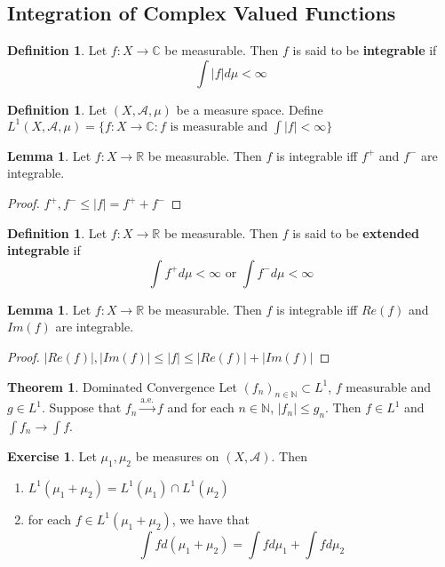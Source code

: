 \documentclass[12pt]{amsart}
\theoremstyle{definition}
\newtheorem{defn}[definition]{Definition}
\newtheorem{thm}[definition]{Theorem}
\newtheorem{lem}[definition]{Lemma}
\newtheorem{ex}[definition]{Exercise}
\newcommand{\C}{\mathbb{C}}
\newcommand{\N}{\mathbb{N}}
\newcommand{\R}{\mathbb{R}}
\newcommand{\MA}{\mathcal{A}}
\begin{document}
	\subsection{Integration of Complex Valued Functions}
	
	\begin{defn}
		Let $f:X \rightarrow \C$ be measurable. Then $f$ is said to be \textbf{integrable} if $$\int |f| d\mu < \infty$$
	\end{defn}
	
	\begin{defn}
		Let $(X, \MA, \mu)$ be a measure space. Define $L^1(X, \MA, \mu) = \{f:X \rightarrow \C : f \text{ is measurable and } \int |f| < \infty \}$
	\end{defn}
	
	\begin{lem}
		Let $f:X \rightarrow \R$ be measurable. Then $f$ is integrable iff $f^+$ and $f^-$ are integrable. 
	\end{lem}
	
	\begin{proof}
		$f^+,f^- \leq |f| = f^+ + f^-$
	\end{proof}
	
	\begin{defn}
		Let $f:X \rightarrow \R$ be measurable. Then $f$ is said to be \textbf{extended integrable} if $$\int f^+ d\mu  < \infty \text{ or } \int f^- d\mu < \infty$$
	\end{defn}
	
	\begin{lem}
		Let $f:X \rightarrow \R$ be measurable. Then $f$ is integrable iff $Re(f)$ and $Im(f)$ are integrable.
	\end{lem}
	
	\begin{proof}
		$|Re(f)|, |Im(f)| \leq |f| \leq |Re(f)| + |Im(f)|$
	\end{proof}
	
	\begin{thm}{Dominated Convergence}
		Let $(f_n)_{n \in \N} \subset L^1$, $f$ measurable and $g \in L^1$. Suppose that $f_n \xrightarrow{\text{a.e.}} f$ and for each $n \in \N$, $|f_n| \leq g_n$. Then $f \in L^1$ and $\int f_n \rightarrow \int f$. 
	\end{thm}
	
	\begin{ex}
		Let $\mu_1, \mu_2$ be measures on $(X, \MA)$. Then
		\begin{enumerate}
			\item $L^1(\mu_1 + \mu_2) = L^1(\mu_1) \cap L^1(\mu_2)$
			
			\item for each $f \in L^1(\mu_1 + \mu_2)$, we have that $$\int f d(\mu_1 + \mu_2) = \int f d \mu_1 + \int f d\mu_2$$
		\end{enumerate}
		
	\end{ex}
	
\end{document}
